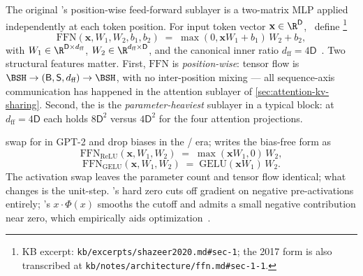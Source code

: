 The original 's position-wise feed-forward sublayer is a
two-matrix MLP applied independently at each token position. For input
token vector $\mathbf{x} \in \R^{\mathsf{D}}$,~\citet{vaswani2017}
define%
\footnote{KB excerpt: \nolinkurl{kb/excerpts/shazeer2020.md#sec-1}; the
2017 form is also transcribed at
\nolinkurl{kb/notes/architecture/ffn.md#sec-1-1}.}
\begin{equation}
  \mathrm{FFN}(\mathbf{x}, W_1, W_2, b_1, b_2)
  \;=\; \max(0, \mathbf{x} W_1 + b_1)\, W_2 + b_2,
  \tag{Vaswani--Eq.~2}
  \label{eq:vaswani-ffn}
\end{equation}
with $W_1 \in \R^{\mathsf{D} \times d_{\text{ff}}}$,
$W_2 \in \R^{d_{\text{ff}} \times \mathsf{D}}$, and the canonical
inner ratio $d_{\text{ff}} = 4\mathsf{D}$~\citep[\S 3.3]{vaswani2017}.
Two structural features matter. First, $\mathrm{FFN}$ is
\emph{position-wise}: tensor flow is $\BSH \to (\mathsf{B}, \mathsf{S},
d_{\text{ff}}) \to \BSH$, with no inter-position mixing --- all
sequence-axis communication has happened in the attention sublayer of
\cref{sec:attention-kv-sharing}. Second, the  is the
\emph{parameter-heaviest} sublayer in a typical block: at $d_{\text{ff}}
= 4\mathsf{D}$ each  holds $8\mathsf{D}^2$  versus
$4\mathsf{D}^2$ for the four attention projections.

\citet{radford2019-gpt2} swap  for  in GPT-2 and drop biases in
the / era; \citet{shazeer2020} writes the bias-free form
as~\citep[\S 1, Eq.~2]{shazeer2020}
\begin{equation}
  \mathrm{FFN}_{\mathrm{ReLU}}(\mathbf{x}, W_1, W_2)
  \;=\; \max(\mathbf{x} W_1, 0)\, W_2,
  \tag{Shazeer--Eq.~2}
  \label{eq:relu-ffn}
\end{equation}
\begin{equation}
  \mathrm{FFN}_{\mathrm{GELU}}(\mathbf{x}, W_1, W_2)
  \;=\; \mathrm{GELU}(\mathbf{x} W_1)\, W_2.
  \tag{Shazeer--Eq.~3}
  \label{eq:gelu-ffn}
\end{equation}
The activation swap leaves the parameter count and tensor flow
identical; what changes is the unit-step. 's hard zero cuts off
gradient on negative pre-activations entirely; 's
$x \cdot \Phi(x)$ smooths the cutoff and admits a small negative
contribution near zero, which empirically aids
optimization~\citep[\S 2.3]{radford2019-gpt2}.

